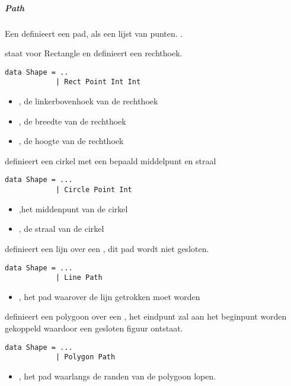 \subparagraph{Path}
Een  definieert een pad, als een lijst van punten. .

 staat voor Rectangle en definieert een rechthoek. 
\begin{lstlisting}
data Shape = ..
			| Rect Point Int Int
\end{lstlisting}
\begin{itemize}
	\item {}, de linkerbovenhoek van de rechthoek
	\item {}, de breedte van de rechthoek
	\item {}, de hoogte van de rechthoek
\end{itemize}

 definieert een cirkel met een bepaald middelpunt en straal
\begin{lstlisting}
data Shape = ...
			| Circle Point Int
\end{lstlisting}
\begin{itemize}
	\item {},het middenpunt van de cirkel
	\item {}, de straal van de cirkel
\end{itemize}

 definieert een lijn over een , dit pad wordt niet gesloten.
\begin{lstlisting}
data Shape = ...
			| Line Path
\end{lstlisting}
\begin{itemize}
	\item {}, het pad waarover de lijn getrokken moet worden
\end{itemize}		

 definieert een polygoon over een , het eindpunt zal aan het beginpunt worden gekoppeld waardoor een gesloten figuur ontstaat.
\begin{lstlisting}
data Shape = ...
			| Polygon Path
\end{lstlisting}
\begin{itemize}
	\item {}, het pad waarlangs de randen van de polygoon lopen.
\end{itemize}

